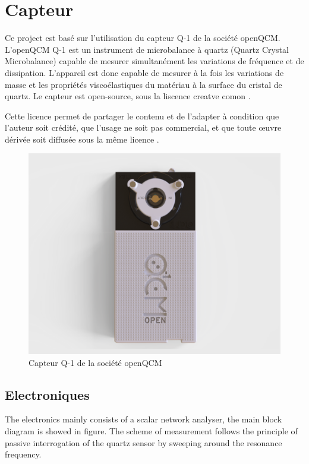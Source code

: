 \chapter{Capteur}

Ce project est basé sur l'utilisation du capteur Q-1 de la société openQCM.
L’openQCM Q-1 est un instrument de microbalance à quartz (Quartz Crystal Microbalance) capable de mesurer simultanément les variations de fréquence et de dissipation. 
L’appareil est donc capable de mesurer à la fois les variations de masse et les propriétés viscoélastiques du matériau à la surface du cristal de quartz.
Le capteur est open-source, sous la liscence creatve comon \cite{manual-openqcmQ1}.

Cette licence permet de partager le contenu et de l’adapter à condition que l’auteur soit crédité, que l’usage ne soit pas commercial, 
et que toute œuvre dérivée soit diffusée sous la même licence \cite{cc-by-nc-sa-4.0}.

\begin{figure}[H]
    \centering
    \includegraphics[width=\textwidth]{assets/figures/Quartz-Crystal-Microbalance-QCM-D-openQCM-Q-1.png}
    \caption{Capteur Q-1 de la société openQCM}
    \label{fig:Q-1}
\end{figure}

\section{Electroniques}
The electronics mainly consists of a scalar network analyser, the main block diagram is showed in
figure. The scheme of measurement follows the principle of passive interrogation of the quartz
sensor by sweeping around the resonance frequency.

